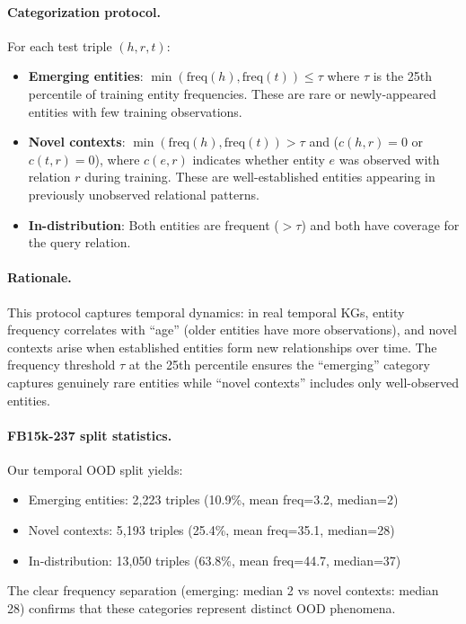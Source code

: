 \documentclass{article}
\begin{document}
\paragraph{Categorization protocol.}
For each test triple $(h,r,t)$:
\begin{itemize}
\item \textbf{Emerging entities}: $\min(\text{freq}(h), \text{freq}(t)) \leq \tau$ where $\tau$ is the 25th percentile of training entity frequencies. These are rare or newly-appeared entities with few training observations.

\item \textbf{Novel contexts}: $\min(\text{freq}(h), \text{freq}(t)) > \tau$ and ($c(h,r)=0$ or $c(t,r)=0$), where $c(e,r)$ indicates whether entity $e$ was observed with relation $r$ during training. These are well-established entities appearing in previously unobserved relational patterns.

\item \textbf{In-distribution}: Both entities are frequent ($> \tau$) and both have coverage for the query relation.
\end{itemize}

\paragraph{Rationale.}
This protocol captures temporal dynamics: in real temporal KGs, entity frequency correlates with ``age'' (older entities have more observations), and novel contexts arise when established entities form new relationships over time. The frequency threshold $\tau$ at the 25th percentile ensures the ``emerging'' category captures genuinely rare entities while ``novel contexts'' includes only well-observed entities.

\paragraph{FB15k-237 split statistics.}
Our temporal OOD split yields:
\begin{itemize}
\item Emerging entities: 2,223 triples (10.9\%, mean freq=3.2, median=2)
\item Novel contexts: 5,193 triples (25.4\%, mean freq=35.1, median=28)
\item In-distribution: 13,050 triples (63.8\%, mean freq=44.7, median=37)
\end{itemize}

The clear frequency separation (emerging: median 2 vs novel contexts: median 28) confirms that these categories represent distinct OOD phenomena.
\end{document}
